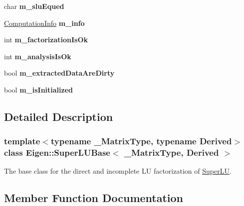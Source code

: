 \begin{DoxyCompactItemize}
char {\bfseries m\+\_\+slu\+Equed}
\item 
\mbox{\label{class_eigen_1_1_super_l_u_base_a5d5ffbddf43cbca1994bbf6a469635f3}} 
\mbox{\hyperlink{group__enums_ga85fad7b87587764e5cf6b513a9e0ee5e}{Computation\+Info}} {\bfseries m\+\_\+info}
\item 
\mbox{\label{class_eigen_1_1_super_l_u_base_aea5a50c7ac8ae29dc9e8af39b5a85d4c}} 
int {\bfseries m\+\_\+factorization\+Is\+Ok}
\item 
\mbox{\label{class_eigen_1_1_super_l_u_base_ab771204f054be8e628428be9bdc321fd}} 
int {\bfseries m\+\_\+analysis\+Is\+Ok}
\item 
\mbox{\label{class_eigen_1_1_super_l_u_base_a052669972e19b3225e3cb110c41876a1}} 
bool {\bfseries m\+\_\+extracted\+Data\+Are\+Dirty}
\item 
\mbox{\label{class_eigen_1_1_super_l_u_base_ac52101f69d048d5c4b036eadf1f13673}} 
bool {\bfseries m\+\_\+is\+Initialized}
\end{DoxyCompactItemize}


\subsection{Detailed Description}
\subsubsection*{template$<$typename \+\_\+\+Matrix\+Type, typename Derived$>$\newline
class Eigen\+::\+Super\+L\+U\+Base$<$ \+\_\+\+Matrix\+Type, Derived $>$}

The base class for the direct and incomplete LU factorization of \mbox{\hyperlink{class_eigen_1_1_super_l_u}{Super\+LU}}. 

\subsection{Member Function Documentation}
\mbox{\label{class_eigen_1_1_super_l_u_base_a2d3f48425328d9b3cbdca369889007f3}} 
